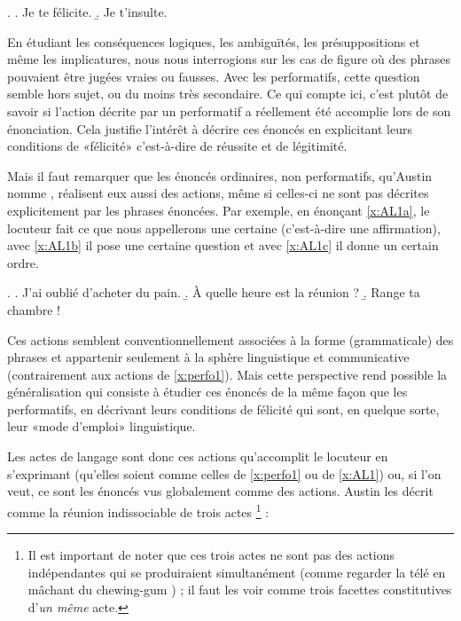 \begin{refsegment}
\ex.
\a. Je te félicite. \label{x:perfo2a}
\b. Je t'insulte. \label{x:perfo2b}


En étudiant les conséquences logiques, les ambiguïtés, les présuppositions et même les implicatures, nous nous interrogions sur les cas de figure où des phrases pouvaient être jugées vraies ou fausses.  Avec les performatifs, cette question semble hors sujet, ou du moins très secondaire.  Ce qui compte ici, c'est plutôt de savoir si l'action décrite par un performatif a réellement été accomplie lors de son énonciation.  Cela justifie l'intérêt à décrire ces énoncés en explicitant leurs conditions de «félicité» c'est-à-dire de réussite et de légitimité. 


Mais il faut remarquer que les énoncés ordinaires, non performatifs, qu'Austin nomme , réalisent eux aussi des actions, même si celles-ci ne sont pas décrites explicitement par les phrases énoncées.  Par exemple, en énonçant \ref{x:AL1a}, le locuteur fait ce que nous appellerons une certaine  (c'est-à-dire une affirmation), avec \ref{x:AL1b} il pose une certaine question et avec \ref{x:AL1c} il donne un certain ordre. 

\ex. \label{x:AL1}
\a. J'ai oublié d'acheter du pain. \label{x:AL1a} %
\b. À quelle heure est la réunion ? \label{x:AL1b} %
\b. Range ta chambre ! \label{x:AL1c}  %


Ces actions semblent conventionnellement associées à la forme (grammaticale) des phrases et appartenir seulement à la sphère linguistique et communicative (contrairement aux actions de \ref{x:perfo1}). 
Mais cette perspective rend possible la généralisation qui consiste à étudier ces énoncés de la même façon que les performatifs, en décrivant leurs conditions de félicité qui sont, en quelque sorte, leur «mode d'emploi» linguistique. 

Les actes de langage sont donc ces actions qu'accomplit le locuteur en s'exprimant (qu'elles soient comme celles de \ref{x:perfo1} ou de \ref{x:AL1}) ou, si l'on veut, ce sont les énoncés vus globalement comme des actions.  
Austin les décrit comme la réunion indissociable de trois actes%
\footnote{Il est important de noter que ces trois actes ne sont pas des actions indépendantes qui se produiraient simultanément (comme regarder la télé en mâchant du chewing-gum ) ; il faut les voir comme trois facettes constitutives d'\emph{un même}  acte.} :


\end{refsegment}
